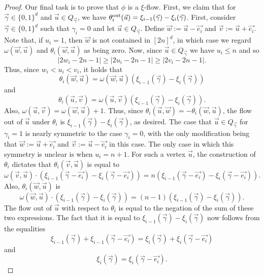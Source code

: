 \documentclass[12pt,a4paper]{amsart}
\numberwithin{equation}{section}
\theoremstyle{definition}
\begin{document}
\begin{proof}
Our final task is to prove that $\phi$ is a $\xi$-flow. First, we claim that for $\vec{\gamma}\in\{0,1\}^d$ and $\vec{u}\in Q_{\vec{\gamma}}$, we have $\theta_i^{\operatorname{out}}(\vec{u}) = \xi_{i-1}(\vec{\gamma})-\xi_{i}(\vec{\gamma})$. First, consider $\vec{\gamma}\in\{0,1\}^d$ such that $\gamma_i=0$ and let $\vec{u}\in Q_{\vec{\gamma}}$. Define $\vec{w}:=\vec{u}-\vec{e_i}$ and $\vec{v}:=\vec{u}+\vec{e_i}$. Note that, if $u_i=1$, then $\vec{w}$ is not contained in $[2n]^d$, in which case we regard $\omega(\vec{w},\vec{u})$ and $\theta_i(\vec{w},\vec{u})$ as being zero. Now, since $\vec{u}\in Q_{\vec{\gamma}}$ we have $u_i\leq n$ and so 
\[|2w_i-2n-1|\geq |2u_i-2n-1|\geq |2v_i-2n-1|.\]
Thus, since $w_i<u_i<v_i$, it holds that
\[\theta_i(\vec{w},\vec{u})= \omega(\vec{w},\vec{u})\left(\xi_{i-1}(\vec{\gamma})-\xi_{i}(\vec{\gamma})\right)\]
and
\[\theta_i(\vec{u},\vec{v})= \omega(\vec{u},\vec{v})\left(\xi_{i-1}(\vec{\gamma})-\xi_{i}(\vec{\gamma})\right).\]
Also, $\omega(\vec{u},\vec{v})=\omega(\vec{w},\vec{u})+1$. Thus, since $\theta_i(\vec{u},\vec{w})=-\theta_i(\vec{w},\vec{u})$, the flow out of $\vec{u}$ under $\theta_i$ is $\xi_{i-1}(\vec{\gamma})-\xi_{i}(\vec{\gamma})$, as desired. The case that $\vec{u}\in Q_{\vec{\gamma}}$ for $\gamma_i=1$ is nearly symmetric to the case $\gamma_i=0$, with the only modification being that $\vec{w}:=\vec{u}+\vec{e_i}$ and $\vec{v}:=\vec{u}-\vec{e_i}$ in this case. The only case in which this symmetry is unclear is when $u_i=n+1$. For such a vertex $\vec{u}$, the construction of $\theta_i$ dictates that $\theta_i(\vec{v},\vec{u})$ is equal to 
\[\omega(\vec{v},\vec{u})\cdot \left(\xi_{i-1}(\vec{\gamma}-\vec{e_i}) - \xi_i(\vec{\gamma}-\vec{e_i})\right) = n\left(\xi_{i-1}(\vec{\gamma}-\vec{e_i}) - \xi_i(\vec{\gamma}-\vec{e_i})\right).\]
Also, $\theta_i(\vec{w},\vec{u})$ is
\[\omega(\vec{w},\vec{u})\cdot \left(\xi_{i-1}(\vec{\gamma}) - \xi_i(\vec{\gamma})\right) = (n-1)\left(\xi_{i-1}(\vec{\gamma}) - \xi_i(\vec{\gamma})\right).\]
The flow out of $\vec{u}$ with respect to $\theta_i$ is equal to the negation of the sum of these two expressions. The fact that it is equal to $\xi_{i-1}(\vec{\gamma})-\xi_{i}(\vec{\gamma})$ now follows from the equalities 
\[\xi_{i-1}(\vec{\gamma})+\xi_{i-1}(\vec{\gamma}-\vec{e_i})=\xi_i(\vec{\gamma})+\xi_i(\vec{\gamma}-\vec{e_i})\]
and
\[\xi_i(\vec{\gamma})=\xi_i(\vec{\gamma}-\vec{e_i}).\] 


\end{proof}
\end{document}
